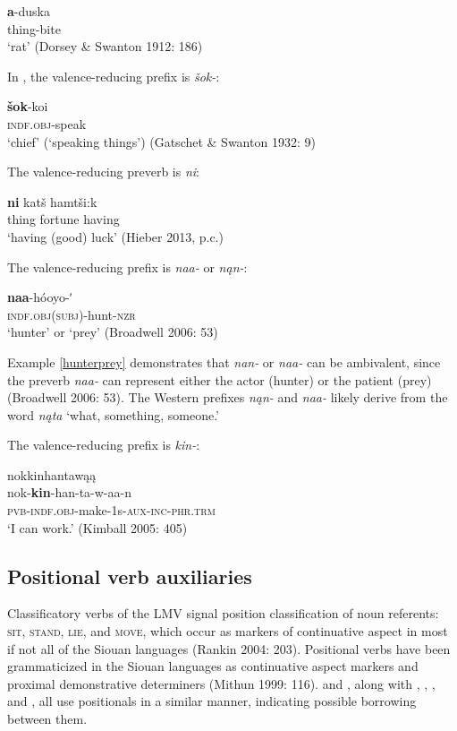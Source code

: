 \documentclass[output=paper]{LSP/langsci}
\begin{document}
\ea
\gll	\textbf{a}-duska\\
		thing-bite\\
\glt	 `rat' (Dorsey \& Swanton 1912: 186)
\z

	In , the valence-reducing prefix is \emph{šok-}:

\ea
\gll	\textbf{šok}-koi\\
		\textsc{indf.obj}-speak \\

\glt	`chief' (`speaking things') (Gatschet \& Swanton 1932: 9)
\z

The  valence-reducing preverb is \emph{ni}:

\ea
\gll	\textbf{ni} 	katš hamtši:k \\
	thing fortune having\\

\glt `having (good) luck' (Hieber 2013, p.c.)
\z

	The  valence-reducing prefix is \emph{naa-} or \emph{nąn-}:
	
\ea\label{hunterprey}
\gll	\textbf{naa}-hóoyo-ʹ~\\
		\textsc{indf.obj(subj)}-hunt-\textsc{nzr}\\
\glt	`hunter' or `prey' (Broadwell 2006: 53)
\z

Example \ref{hunterprey} demonstrates that  \emph{nan-} or \emph{naa-} can be ambivalent, since the preverb \emph{naa-} can represent either the actor (hunter) or the patient (prey) (Broadwell 2006: 53). The Western  prefixes \emph{nąn-} and \emph{naa-} likely derive from the word \emph{nąta} `what, something, someone.'
 
	The  valence-reducing prefix is \emph{kin-}:
	
\ea	nokkinhantawąą\\
\gll		nok-\textbf{kin}-han-ta-w-aa-n\\
		\textsc{pvb-indf.obj}-make-1s-\textsc{aux-inc-phr.trm}\\
\glt	`I can work.' (Kimball 2005: 405)
\z

\subsection{Positional verb auxiliaries}

Classificatory verbs of the LMV signal position classification of noun referents: \textsc{sit}, \textsc{stand}, \textsc{lie}, and \textsc{move}, which occur as markers of continuative aspect in most if not all of the Siouan languages (Rankin 2004: 203). Positional verbs have been grammaticized in the Siouan languages as continuative aspect markers and proximal demonstrative determiners (Mithun 1999: 116).  and , along with , , , and , all use positionals in a similar manner, indicating possible borrowing between them. 
\end{document}
